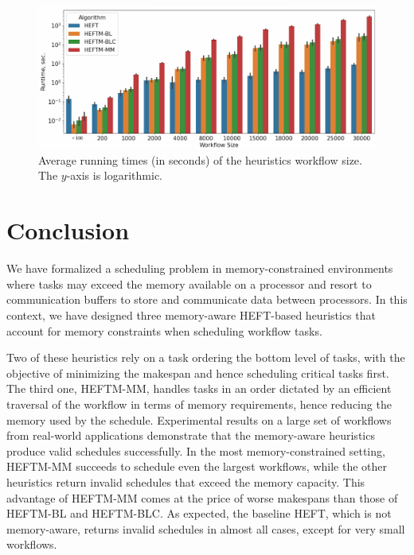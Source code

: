 \documentclass[conference]{IEEEtran}
\newcommand{\algo}[1]{\textsc{#1}}
\newcommand{\heft}{\algo{HEFT}\xspace}
\newcommand{\heftmm}{\algo{HEFTM-MM}\xspace}
\newcommand{\heftbl}{\algo{HEFTM-BL}\xspace}
\newcommand{\heftblc}{\algo{HEFTM-BLC}\xspace}
\begin{document}
\begin{figure}[tb]
    \centering
    \includegraphics[width=1\columnwidth] {images/runtimes-logarithmic2}
    \caption{Average running times (in seconds) of the heuristics \wrt workflow size. The $y$-axis is logarithmic.}
    \label{fig:runtimes-log}
    \vspace{-0.3cm}
\end{figure}




\bigskip
\section{Conclusion}
\label{sec:conc}

We have formalized a scheduling problem in memory-constrained environments where tasks
may exceed the memory available on a processor and resort to communication buffers
to store and communicate data between processors. In this context, we have 
designed three memory-aware HEFT-based heuristics that account for memory
constraints when scheduling workflow tasks. 

Two of these heuristics rely on a task ordering \wrt the bottom level of tasks, with the objective
of minimizing the makespan and hence scheduling critical tasks first. The third one, \heftmm,
handles tasks in an order dictated by an efficient traversal
of the workflow in terms of memory requirements, hence reducing the memory used
by the schedule. Experimental results on a large set of workflows from real-world applications
demonstrate that the memory-aware heuristics produce valid schedules successfully. 
In the most memory-constrained setting, \heftmm succeeds to schedule even the largest workflows,
while the other heuristics return invalid schedules that exceed the memory capacity. 
This advantage of \heftmm comes at the price of worse makespans than those of \heftbl
and \heftblc. %
As expected, the baseline \heft, which is not memory-aware, returns invalid schedules in almost
all cases, except for very small workflows. 
\end{document}
